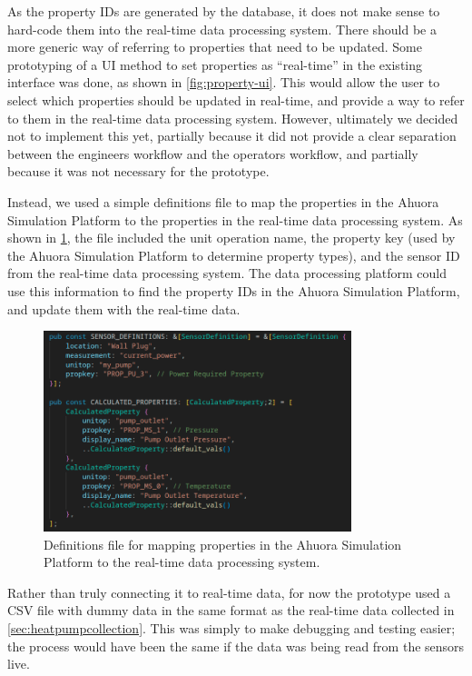 \documentclass[12pt]{report}
\begin{document}
As the property IDs are generated by the database, it does not make sense to hard-code them into the real-time data processing system. There should be a more generic way of referring to properties that need to be updated. Some prototyping of a UI method to set properties as ``real-time'' in the existing interface was done, as shown in \cref{fig:property-ui}. This would allow the user to select which properties should be updated in real-time, and provide a way to refer to them in the real-time data processing system. However, ultimately we decided not to implement this yet, partially because it did not provide a clear separation between the engineers workflow and the operators workflow, and partially because it was not necessary for the prototype.

Instead, we used a simple definitions file to map the properties in the Ahuora Simulation Platform to the properties in the real-time data processing system. As shown in \cref{fig:live-constants}, the file included the unit operation name, the property key (used by the Ahuora Simulation Platform to determine property types), and the sensor ID from the real-time data processing system. The data processing platform could use this information to find the property IDs in the Ahuora Simulation Platform, and update them with the real-time data.

\begin{figure}
    \centering
    \includegraphics[width=0.8\textwidth]{live_constants.png}
    \caption{Definitions file for mapping properties in the Ahuora Simulation Platform to the real-time data processing system.}
    \label{fig:live-constants}
\end{figure}

Rather than truly connecting it to real-time data, for now the prototype used a CSV file with dummy data in the same format as the real-time data collected in \cref{sec:heatpumpcollection}. This was simply to make debugging and testing easier; the process would have been the same if the data was being read from the sensors live.
\end{document}
